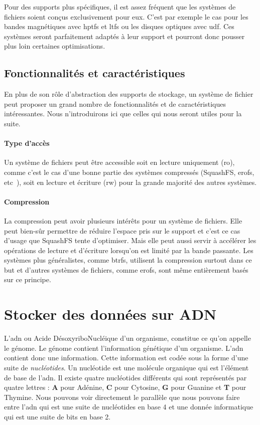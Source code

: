 \documentclass[a4paper]{report}
\begin{document}
Pour des supports plus spécifiques, il est assez fréquent que les systèmes de fichiers soient conçus exclusivement pour eux.
C'est par exemple le cas pour les bandes magnétiques avec \ac{hptfs} et \ac{ltfs} ou les disques optiques avec \ac{udf}.
Ces systèmes seront parfaitement adaptés à leur support et pourront donc pousser plus loin certaines optimisations.

\subsection{Fonctionnalités et caractéristiques}

En plus de son rôle d'abstraction des supports de stockage,
un système de fichier peut proposer un grand nombre de fonctionnalités et de caractéristiques intéressantes.
Nous n'introduirons ici que celles qui nous seront utiles pour la suite.

\paragraph{Type d'accès}
Un système de fichiers peut être accessible soit en lecture uniquement (\ac{ro}),
comme c'est le cas d'une bonne partie des systèmes compressés (SquashFS, \ac{erofs}, etc~\textellipsis),
soit en lecture et écriture (\ac{rw}) pour la grande majorité des autres systèmes.

\paragraph{Compression}
La compression peut avoir plusieurs intérêts pour un système de fichiers.
Elle peut bien-sûr permettre de réduire l'espace pris sur le support
et c'est ce cas d'usage que SquashFS tente d'optimiser.
Mais elle peut aussi servir à accélérer les opérations de lecture et d'écriture lorsqu'on est limité par la bande passante.
Les systèmes plus généralistes, comme \ac{btrfs}, utilisent la compression surtout dans ce but
et d'autres systèmes de fichiers, comme \ac{erofs}, sont même entièrement basés sur ce principe.


\section{Stocker des données sur ADN}

L’\ac{adn} ou Acide DésoxyriboNucléique d’un organisme, constitue ce qu’on appelle le génome.
Le génome contient l’information génétique d’un organisme. L’\ac{adn} contient donc une information.
Cette information est codée sous la forme d’une suite de \emph{nucléotides}.
Un nucléotide est une molécule organique qui est l’élément de base de l’\ac{adn}.
Il existe quatre nucléotides différents qui sont représentés par quatre lettres : \textbf{A} pour Adénine, \textbf{C} pour Cytosine, \textbf{G} pour Guanine et \textbf{T} pour Thymine.
Nous pouvons voir directement le parallèle que nous pouvons faire entre l’\ac{adn} qui est une suite de nucléotides en base 4 et une donnée informatique qui est une suite de bits en base 2.
\end{document}
